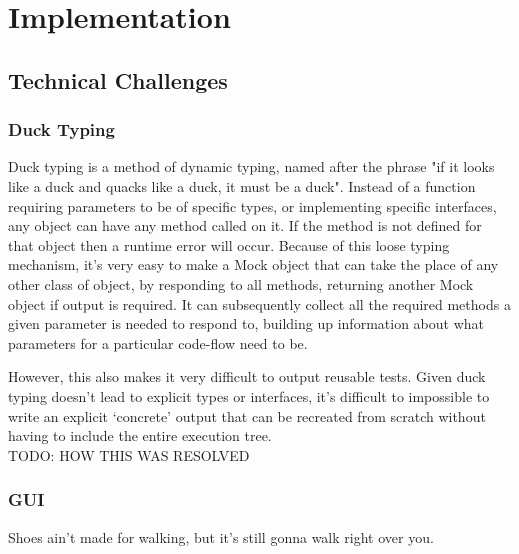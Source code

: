 \chapter{Implementation}
\section{Technical Challenges}
  \subsection{Duck Typing}
    Duck typing is a method of dynamic typing, named after the phrase "if it looks like a duck and quacks like a duck, it must be a duck".
    Instead of a function requiring parameters to be of specific types, or implementing specific interfaces, any object can have any method called on it.
    If the method is not defined for that object then a runtime error will occur.
    Because of this loose typing mechanism, it's very easy to make a Mock object that can take the place of any other class of object, by responding to all methods, returning another Mock object if output is required.
    It can subsequently collect all the required methods a given parameter is needed to respond to, building up information about what parameters for a particular code-flow need to be.

    However, this also makes it very difficult to output reusable tests.
    Given duck typing doesn't lead to explicit types or interfaces, it's difficult to impossible to write an explicit `concrete' output that can be recreated from scratch without having to include the entire execution tree.\\
    TODO: HOW THIS WAS RESOLVED \\

  \subsection{GUI}
    Shoes ain't made for walking, but it's still gonna walk right over you.

    \begin{center}
    \end{center}
